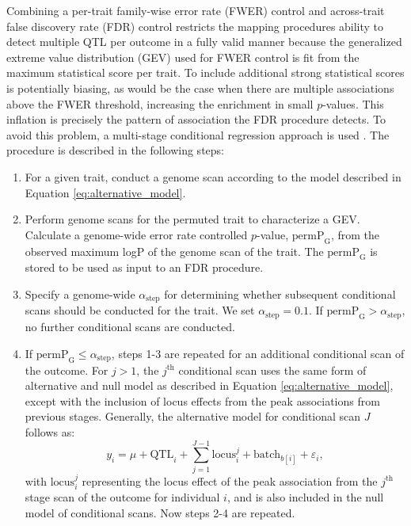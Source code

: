 \documentclass[9pt,twocolumn,twoside]{gsajnl}
\newcommand{\permpg}{\text{permP}_{\text{G}}}
\begin{document}
Combining a per-trait family-wise error rate (FWER) control and across-trait false discovery rate (FDR) control restricts the mapping procedures ability to detect multiple QTL per outcome in a fully valid manner because the generalized extreme value distribution (GEV) used for FWER control is fit from the maximum statistical score per trait. To include additional strong statistical scores is potentially biasing, as would be the case when there are multiple associations above the FWER threshold, increasing the enrichment in small $p$-values. This inflation is precisely the pattern of association the FDR procedure detects. To avoid this problem, a multi-stage conditional regression approach is used \citep{Jansen2017}. The procedure is described in the following steps:
\begin{enumerate}
    \item For a given trait, conduct a genome scan according to the model described in Equation \ref{eq:alternative_model}.
    \item Perform genome scans for the permuted trait to characterize a GEV. Calculate a genome-wide error rate controlled $p$-value, $\permpg$, from the observed maximum logP of the genome scan of the trait. The $\permpg$ is stored to be used as input to an FDR procedure.
    \item Specify a genome-wide $\alpha_{\text{step}}$ for determining whether subsequent conditional scans should be conducted for the trait. We set $\alpha_{\text{step}} = 0.1$. If $\permpg > \alpha_{\text{step}}$, no further conditional scans are conducted.
    \item If $\permpg \le \alpha_{\text{step}}$, steps 1-3 are repeated for an additional conditional scan of the outcome. For $j > 1$, the $j^{\text{th}}$ conditional scan uses the same form of alternative and null model as described in Equation \ref{eq:alternative_model}, except with the inclusion of locus effects from the peak associations from previous stages. Generally, the alternative model for conditional scan $J$ follows as:
\begin{equation}
y_{i} = \mu + \text{QTL}_{i} + \sum_{j=1}^{J-1}\text{locus}_{i}^{j} + \text{batch}_{b[i]} + \varepsilon_{i},
\label{eq:conditional_model}
\end{equation}
with $\text{locus}_{i}^{j}$ representing the locus effect of the peak association from the $j^{\text{th}}$ stage scan of the outcome for individual $i$, and is also included in the null model of conditional scans. Now steps 2-4 are repeated.
\end{enumerate}
\end{document}
